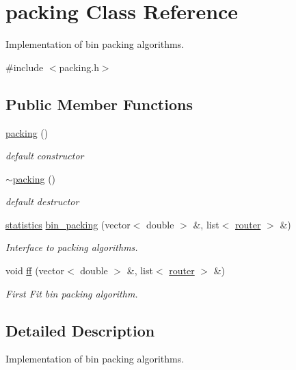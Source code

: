 \hypertarget{classpacking}{\section{packing \-Class \-Reference}
\label{classpacking}
}


\-Implementation of bin packing algorithms.  




{\ttfamily \#include $<$packing.\-h$>$}

\subsection*{\-Public \-Member \-Functions}
\begin{DoxyCompactItemize}
\item 
\hyperlink{classpacking_ad0cae9459a9abfe4bf76642a232ec2f3}{packing} ()
\begin{DoxyCompactList}\small\item\em default constructor \end{DoxyCompactList}\item 
\hyperlink{classpacking_a985cd1712c1e0c7e9f3927e847383810}{$\sim$packing} ()
\begin{DoxyCompactList}\small\item\em default destructor \end{DoxyCompactList}\item 
\hyperlink{classstatistics}{statistics} \hyperlink{classpacking_aa80d123e13482fc9760fd87e44f27e0f}{bin\-\_\-packing} (vector$<$ double $>$ \&, list$<$ \hyperlink{classrouter}{router} $>$ \&)
\begin{DoxyCompactList}\small\item\em \-Interface to packing algorithms. \end{DoxyCompactList}\item 
void \hyperlink{classpacking_acd308605e21d05122f19b6673f7496a2}{ff} (vector$<$ double $>$ \&, list$<$ \hyperlink{classrouter}{router} $>$ \&)
\begin{DoxyCompactList}\small\item\em \-First \-Fit bin packing algorithm. \end{DoxyCompactList}\end{DoxyCompactItemize}


\subsection{\-Detailed \-Description}
\-Implementation of bin packing algorithms. 

